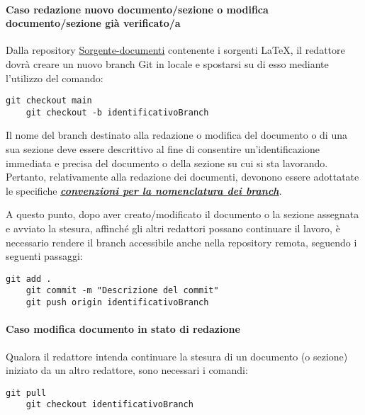 \vspace{0.1cm}

\paragraph*{\textbf{Caso redazione nuovo documento/sezione o modifica documento/sezione già verificato/a}}
Dalla repository \href{https://github.com/ByteOps-swe/Sorgente-documenti}{Sorgente-documenti} contenente i sorgenti \LaTeX, il redattore dovrà creare un nuovo branch Git in locale e spostarsi su di esso mediante l'utilizzo del comando:
\begin{lstlisting}[style=code]
    git checkout main
    git checkout -b identificativoBranch
\end{lstlisting}

Il nome del branch destinato alla redazione o modifica del documento o di una sua sezione deve essere descrittivo al fine di consentire un'identificazione immediata e precisa del documento o della sezione su cui si sta lavorando. Pertanto, relativamente alla redazione dei documenti, devonono essere adottatate le specifiche \hyperlink{par:convezioninomenclaturabranchdocumenti}{\textit{\textbf{convenzioni per la nomenclatura dei branch}}}.

A questo punto, dopo aver creato/modificato il documento o la sezione assegnata e avviato la stesura, affinché gli altri redattori possano continuare il lavoro, è necessario rendere il branch accessibile anche nella repository remota, seguendo i seguenti passaggi:
\begin{lstlisting}[style=code]
    git add .
    git commit -m "Descrizione del commit"
    git push origin identificativoBranch
\end{lstlisting}

\paragraph*{\textbf{Caso modifica documento in stato di redazione}}
Qualora il redattore intenda continuare la stesura di un documento (o sezione) iniziato da un altro redattore, sono necessari i comandi:
\begin{lstlisting}[style=code]
    git pull
    git checkout identificativoBranch
\end{lstlisting}

